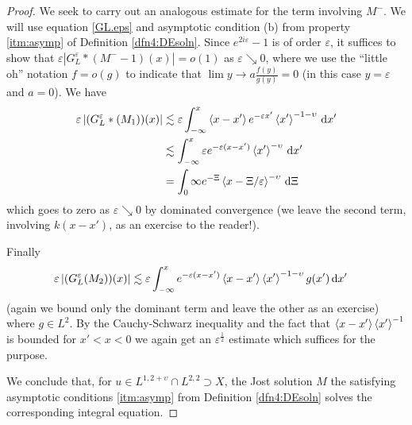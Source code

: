 \documentclass[../dissertation.tex]{subfiles}
\begin{document}
\begin{proof}
	We seek to carry out an analogous estimate for the term involving $M^-$.
	We will use equation \eqref{GL.eps} and asymptotic condition (b) from 
	property \ref{itm:asymp} of Definition \ref{dfn4:DEsoln}. Since 
	$e^{2i\varepsilon}-1$ is of order $\varepsilon$, it suffices to show that
	$\varepsilon \left| G_L^\varepsilon*(M^- -1) (x) \right| = o(1)$
	as $\varepsilon \searrow 0$, where we use the ``little oh'' notation
	$f = o(g)$ to indicate that $\lim{y\to a} \frac{f(y)}{g(y)} = 0$ (in this 
	case $y=\varepsilon$ and $a = 0$).
	We have
	\begin{align*}
		\varepsilon \left| (G_L^\varepsilon * (M_1))(x) \right|
			&\lesssim	
				\varepsilon 
				\int_{-\infty}^x 
					\left\langle x-x' \right\rangle e^{-\varepsilon x'} \left\langle x' \right\rangle^{-1-\upsilon} 
				\, \mathrm{d}x'
				\\
			&\lesssim  
				\int_{-\infty}^x 
					\varepsilon e^{-\varepsilon(x-x')} \left\langle x' \right\rangle^{-\upsilon} 
				\, \mathrm{d}x'	
				\\
			&=	
				\int_0{\infty}
					e^{-\Xi} \left\langle x-\Xi/\varepsilon \right\rangle^{-\upsilon} 
				\, \mathrm{d}\Xi
	\end{align*}
	which goes to zero as $\varepsilon \searrow 0$ by dominated convergence 
	{\color{red}(we leave the second term, involving $k(x-x')$, as an exercise to the 
	reader!)}.

	Finally
	\begin{align*}
		\varepsilon \left| (G_L^\varepsilon (M_2))(x) \right|
			&\lesssim 
				\varepsilon 
				\int_{-\infty}^x 
					e^{-\varepsilon (x-x')} \left\langle x-x' \right\rangle 
					\left\langle x' \right\rangle^{-1-\upsilon} g(x') 
				\, \mathrm{d}x'
		\end{align*}
	{\color{red}(again we bound only the dominant term and leave the other as 
	an exercise)} where $g \in L^2$. By the Cauchy-Schwarz inequality and the 
	fact that $\left\langle x-x' \right\rangle \left\langle x' \right\rangle^{-1}$ is bounded for $x' < x < 0$ we again 
	get an $\varepsilon^{\frac{1}{2}}$ estimate which suffices for the purpose. 

	We conclude that, for $u \in L^{1,2+\upsilon} \cap L^{2,2} \supset X$, 
	the Jost solution $M$ the satisfying asymptotic conditions \ref{itm:asymp}
	from Definition \ref{dfn4:DEsoln} solves the corresponding integral equation.
\end{proof}
\end{document}
